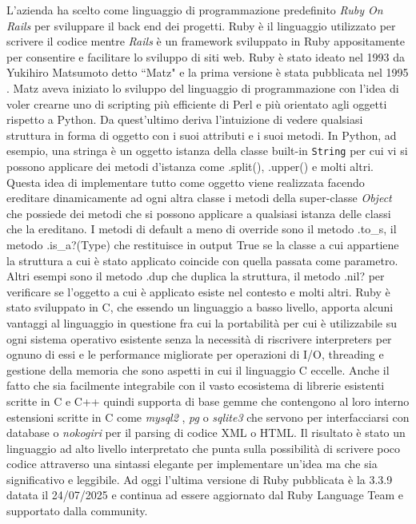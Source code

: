 \documentclass[target=bach,aauheader=,style=]{thud}
\begin{document}
L'azienda ha scelto come linguaggio di programmazione predefinito \textit{Ruby On Rails} \cite{ruby_on_rails} per sviluppare il back end dei progetti.
Ruby è il linguaggio utilizzato per scrivere il codice mentre \textit{Rails} è un framework sviluppato in Ruby appositamente per consentire e facilitare lo sviluppo di siti web.
Ruby è stato ideato nel 1993 da Yukihiro Matsumoto detto ``Matz" e la prima versione è stata pubblicata nel 1995 \cite{ruby_about}.
Matz aveva iniziato lo sviluppo del linguaggio di programmazione con l'idea di voler crearne uno di scripting più efficiente di Perl e più orientato agli oggetti rispetto a Python.
Da quest'ultimo deriva l'intuizione di vedere qualsiasi struttura in forma di oggetto con i suoi attributi e i suoi metodi. In Python, ad esempio, una stringa è un oggetto istanza della classe
built-in \texttt{String} per cui vi si possono applicare dei metodi d'istanza come .split(), .upper() e molti altri.
Questa idea di implementare tutto come oggetto viene realizzata facendo ereditare dinamicamente ad ogni altra classe i metodi della super-classe \textit{Object} che possiede
dei metodi che si possono applicare a qualsiasi istanza delle classi che la ereditano. I metodi di default a meno di override sono il metodo .to\_s, il metodo .is\_a?(Type) che
restituisce in output True se la classe a cui appartiene la struttura a cui è stato applicato coincide con quella passata come parametro. Altri esempi sono il metodo .dup che duplica la struttura,
il metodo .nil? per verificare se l'oggetto a cui è applicato esiste nel contesto e molti altri.
Ruby è stato sviluppato in C, che essendo un linguaggio a basso livello, apporta alcuni vantaggi al linguaggio in questione fra cui la portabilità per cui è utilizzabile su ogni sistema
operativo esistente senza la necessità di riscrivere interpreters per ognuno di essi e le performance migliorate per operazioni di I/O, threading e gestione della memoria che sono
aspetti in cui il linguaggio C eccelle. Anche il fatto che sia facilmente integrabile con il vasto ecosistema di librerie esistenti scritte in C e C++ quindi supporta
di base gemme che contengono al loro interno estensioni scritte in C come \textit{mysql2} \cite{mysql2_gem}, \textit{pg} \cite{pg_gem} o \textit{sqlite3} \cite{sqlite_home} che servono per
interfacciarsi con database o \textit{nokogiri} \cite{nokogiri_gem} per il parsing di codice XML o HTML.
Il risultato è stato un linguaggio ad alto livello interpretato che punta sulla possibilità di scrivere poco codice attraverso una sintassi elegante per implementare un'idea ma che sia significativo
e leggibile. Ad oggi l'ultima versione di Ruby pubblicata è la 3.3.9 datata il 24/07/2025 \cite{ruby_releases} e continua ad essere aggiornato dal Ruby Language Team e supportato dalla community.
\end{document}
